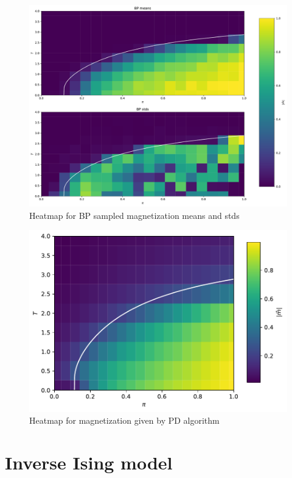 \documentclass[handout]{beamer}
\begin{document}
\begin{frame}[plain]
    \begin{figure}
        \centering
        \includegraphics[width=.8\textwidth]{bp_heatmap}
        \caption{Heatmap for BP sampled magnetization means and stds}
        \label{fig:bp_heatmap}
    \end{figure}
\end{frame}

\begin{frame}[plain]
    \begin{figure}
        \centering
        \includegraphics[width=.8\textwidth]{pd_heatmap}
        \caption{Heatmap for magnetization given by PD algorithm}
        \label{fig:pd_heatmap}
    \end{figure}
\end{frame}

\section{Inverse Ising model}
\end{document}
